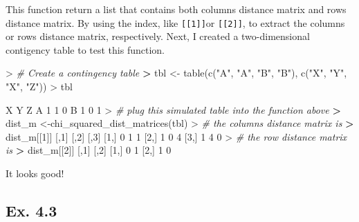 \documentclass[
]{article}
\newenvironment{Shaded}{\begin{snugshade}}{\end{snugshade}}
\newcommand{\CommentTok}[1]{\textcolor[rgb]{0.56,0.35,0.01}{\textit{#1}}}
\newcommand{\DecValTok}[1]{\textcolor[rgb]{0.00,0.00,0.81}{#1}}
\newcommand{\ErrorTok}[1]{\textcolor[rgb]{0.64,0.00,0.00}{\textbf{#1}}}
\newcommand{\FunctionTok}[1]{\textcolor[rgb]{0.00,0.00,0.00}{#1}}
\newcommand{\NormalTok}[1]{#1}
\newcommand{\OtherTok}[1]{\textcolor[rgb]{0.56,0.35,0.01}{#1}}
\newcommand{\SpecialCharTok}[1]{\textcolor[rgb]{0.00,0.00,0.00}{#1}}
\newcommand{\StringTok}[1]{\textcolor[rgb]{0.31,0.60,0.02}{#1}}
\begin{document}
This function return a list that contains both columns distance matrix
and rows distance matrix. By using the index, like
\texttt{{[}{[}1{]}{]}}or \texttt{{[}{[}2{]}{]}}, to extract the columns
or rows distance matrix, respectively. Next, I created a two-dimensional
contigency table to test this function.

\begin{Shaded}
\begin{Highlighting}[]
\SpecialCharTok{\textgreater{}} \CommentTok{\# Create a contingency table}
\ErrorTok{\textgreater{}}\NormalTok{ tbl }\OtherTok{\textless{}{-}} \FunctionTok{table}\NormalTok{(}\FunctionTok{c}\NormalTok{(}\StringTok{"A"}\NormalTok{, }\StringTok{"A"}\NormalTok{, }\StringTok{"B"}\NormalTok{, }\StringTok{"B"}\NormalTok{), }\FunctionTok{c}\NormalTok{(}\StringTok{"X"}\NormalTok{, }\StringTok{"Y"}\NormalTok{, }\StringTok{"X"}\NormalTok{, }\StringTok{"Z"}\NormalTok{))}
\SpecialCharTok{\textgreater{}}\NormalTok{ tbl}
   
\NormalTok{    X Y Z}
\NormalTok{  A }\DecValTok{1} \DecValTok{1} \DecValTok{0}
\NormalTok{  B }\DecValTok{1} \DecValTok{0} \DecValTok{1}
\SpecialCharTok{\textgreater{}} \CommentTok{\# plug this simulated table into the function above}
\ErrorTok{\textgreater{}}\NormalTok{ dist\_m }\OtherTok{\textless{}{-}}\FunctionTok{chi\_squared\_dist\_matrices}\NormalTok{(tbl)}
\SpecialCharTok{\textgreater{}} \CommentTok{\# the columns distance matrix is}
\ErrorTok{\textgreater{}}\NormalTok{ dist\_m[[}\DecValTok{1}\NormalTok{]]}
\NormalTok{     [,}\DecValTok{1}\NormalTok{] [,}\DecValTok{2}\NormalTok{] [,}\DecValTok{3}\NormalTok{]}
\NormalTok{[}\DecValTok{1}\NormalTok{,]    }\DecValTok{0}    \DecValTok{1}    \DecValTok{1}
\NormalTok{[}\DecValTok{2}\NormalTok{,]    }\DecValTok{1}    \DecValTok{0}    \DecValTok{4}
\NormalTok{[}\DecValTok{3}\NormalTok{,]    }\DecValTok{1}    \DecValTok{4}    \DecValTok{0}
\SpecialCharTok{\textgreater{}} \CommentTok{\# the row distance matrix is}
\ErrorTok{\textgreater{}}\NormalTok{ dist\_m[[}\DecValTok{2}\NormalTok{]]}
\NormalTok{     [,}\DecValTok{1}\NormalTok{] [,}\DecValTok{2}\NormalTok{]}
\NormalTok{[}\DecValTok{1}\NormalTok{,]    }\DecValTok{0}    \DecValTok{1}
\NormalTok{[}\DecValTok{2}\NormalTok{,]    }\DecValTok{1}    \DecValTok{0}
\end{Highlighting}
\end{Shaded}

It looks good!

\hypertarget{ex.-4.3}{%
\subsection{Ex. 4.3}\label{ex.-4.3}}
\end{document}
